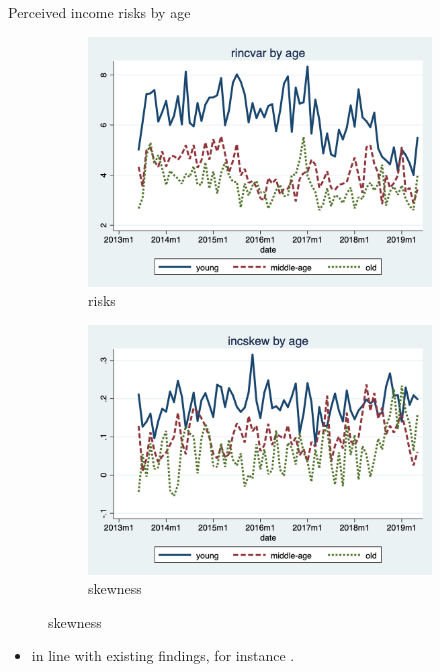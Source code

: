 \documentclass{beamer}
\begin{document}
\begin{frame}{Perceived income risks by age}
	\begin{figure}[ht]
		\label{ts_incvar_age_g_mean}
		\begin{subfigure}[b]{0.46\textwidth}
			\centering
			\caption{risks}
			\includegraphics[width=\textwidth, height = 0.33\textheight]{figures/ts_rincvar_age_g_median.png}
		\end{subfigure}
		\begin{subfigure}[b]{0.46\textwidth}
			\caption{skewness}
			\includegraphics[width=\textwidth, height = 0.33\textheight]{figures/ts_incskew_age_g_mean.png}
	\end{subfigure}
	\end{figure}
\begin{itemize}
	\item in line with existing findings, for instance  
	\cite{bloom2018great}. 
\end{itemize}
 \end{frame}
\end{document}

